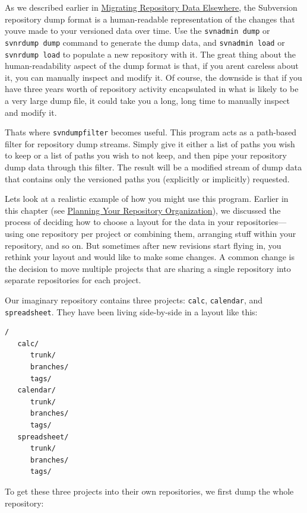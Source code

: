 As we described earlier in
\hyperref[svn.reposadmin.maint.migrate]{Migrating Repository Data
Elsewhere}, the Subversion repository dump format is a human-readable
representation of the changes that you\textquotesingle ve made to your
versioned data over time. Use the \texttt{svnadmin\ dump} or
\texttt{svnrdump\ dump} command to generate the dump data, and
\texttt{svnadmin\ load} or \texttt{svnrdump\ load} to populate a new
repository with it. The great thing about the human-readability aspect
of the dump format is that, if you aren\textquotesingle t careless about
it, you can manually inspect and modify it. Of course, the downside is
that if you have three years\textquotesingle{} worth of repository
activity encapsulated in what is likely to be a very large dump file, it
could take you a long, long time to manually inspect and modify it.

That\textquotesingle s where \texttt{svndumpfilter} becomes useful. This
program acts as a path-based filter for repository dump streams. Simply
give it either a list of paths you wish to keep or a list of paths you
wish to not keep, and then pipe your repository dump data through this
filter. The result will be a modified stream of dump data that contains
only the versioned paths you (explicitly or implicitly) requested.

Let\textquotesingle s look at a realistic example of how you might use
this program. Earlier in this chapter (see
\hyperref[svn.reposadmin.projects.chooselayout]{Planning Your Repository
Organization}), we discussed the process of deciding how to choose a
layout for the data in your repositories---using one repository per
project or combining them, arranging stuff within your repository, and
so on. But sometimes after new revisions start flying in, you rethink
your layout and would like to make some changes. A common change is the
decision to move multiple projects that are sharing a single repository
into separate repositories for each project.

Our imaginary repository contains three projects: \texttt{calc},
\texttt{calendar}, and \texttt{spreadsheet}. They have been living
side-by-side in a layout like this:

\begin{verbatim}
/
   calc/
      trunk/
      branches/
      tags/
   calendar/
      trunk/
      branches/
      tags/
   spreadsheet/
      trunk/
      branches/
      tags/
\end{verbatim}

To get these three projects into their own repositories, we first dump
the whole repository:

